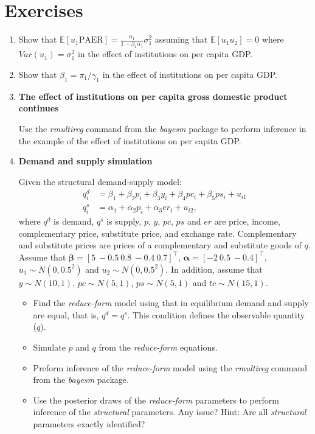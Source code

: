 \section{Exercises}\label{sec76}
\begin{enumerate}
	\item Show that $\mathbb{E}[u_1\text{PAER}]=\frac{\alpha_1}{1-\beta_1\alpha_1}\sigma^2_1$ assuming that $\mathbb{E}[u_1u_2]=0$ where $Var(u_1)=\sigma^2_1$ in the effect of institutions on per capita GDP.
	
	\item Show that $\beta_1=\pi_1/\gamma_1$ in the effect of institutions on per capita GDP.
	
	\item \textbf{The effect of institutions on per capita gross domestic product continues}
	
	Use the \textit{rmultireg} command from the \textit{bayesm} package to perform inference in the example of the effect of institutions on per capita GDP. 
	
	\item \textbf{Demand and supply simulation}
	
	Given the structural demand-supply model:
	\begin{align*}
		q_i^d&=\beta_1+\beta_2p_i+\beta_3y_i+\beta_4pc_i+\beta_5ps_i+u_{i1}\\
		q_i^s&=\alpha_1+\alpha_2p_i+\alpha_3er_i+u_{i2},
	\end{align*}
where $q^d$ is demand, $q^s$ is supply, $p$, $y$, $pc$, $ps$ and $er$ are price, income, complementary price, substitute price, and exchange rate. Complementary and substitute prices are prices of a complementary and substitute goods of $q$. Assume that $\bm{\beta}=\left[5 \ -0.5 \ 0.8 \ -0.4 \ 0.7\right]^{\top}$, $\bm{\alpha}=\left[-2 \ 0.5 \ -0.4\right]^{\top}$, $u_1\sim N(0, 0.5^2)$ and $u_2\sim N(0, 0.5^2)$. In addition, assume that $y\sim N(10,1)$, $pc\sim N(5,1)$, $ps\sim N(5,1)$ and $tc\sim N(15,1)$.
\begin{itemize}
	\item Find the \textit{reduce-form} model using that in equilibrium demand and supply are equal, that is, $q^d=q^s$. This condition defines the observable quantity ($q$).
	\item Simulate $p$ and $q$ from the \textit{reduce-form} equations.
	\item Preform inference of the \textit{reduce-form} model using the \textit{rmultireg} command from the \textit{bayesm} package.
	\item Use the posterior draws of the \textit{reduce-form} parameters to perform inference of the \textit{structural} parameters. Any issue? Hint: Are all \textit{structural} parameters exactly identified?   
\end{itemize}


\end{enumerate}
